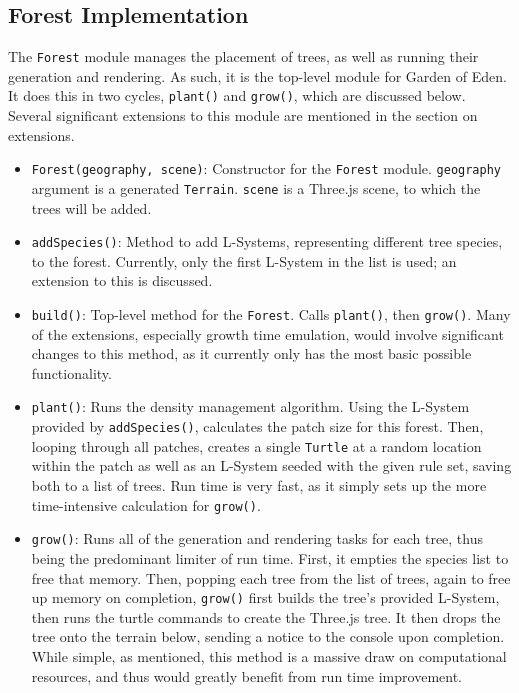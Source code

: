 \documentclass{article}
\newcommand{\tab}{\hspace*{2em}}
\begin{document}
    \subsection{Forest Implementation}
    \tab The \verb|Forest| module manages the placement of trees, as well as running their
generation and rendering. As such, it is the top-level module for Garden of Eden. It does this in
two cycles, \verb|plant()| and \verb|grow()|, which are discussed below. Several significant
extensions to this module are mentioned in the section on extensions.
\begin{itemize}
    \item \verb|Forest(geography, scene)|: Constructor for the \verb|Forest| module.
\verb|geography| argument is a generated \verb|Terrain|. \verb|scene| is a Three.js scene, to which
the trees will be added.

    \item \verb|addSpecies()|: Method to add L-Systems, representing different tree species, to the
forest. Currently, only the first L-System in the list is used; an extension to this is discussed.

    \item \verb|build()|: Top-level method for the \verb|Forest|. Calls \verb|plant()|, then
\verb|grow()|. Many of the extensions, especially growth time emulation, would involve significant
changes to this method, as it currently only has the most basic possible functionality.

    \item \verb|plant()|: Runs the density management algorithm. Using the L-System provided by
\verb|addSpecies()|, calculates the patch size for this forest. Then, looping through all patches,
creates a single \verb|Turtle| at a random location within the patch as well as an L-System seeded
with the given rule set, saving both to a list of trees. Run time is very fast, as it simply sets up
the more time-intensive calculation for \verb|grow()|.

    \item \verb|grow()|: Runs all of the generation and rendering tasks for each tree, thus being
the predominant limiter of run time. First, it empties the species list to free that memory. Then,
popping each tree from the list of trees, again to free up memory on completion, \verb|grow()|
first builds the tree's provided L-System, then runs the turtle commands to create the Three.js
tree. It then drops the tree onto the terrain below, sending a notice to the console upon
completion. While simple, as mentioned, this method is a massive draw on computational resources,
and thus would greatly benefit from run time improvement.

\end{itemize}
\end{document}
